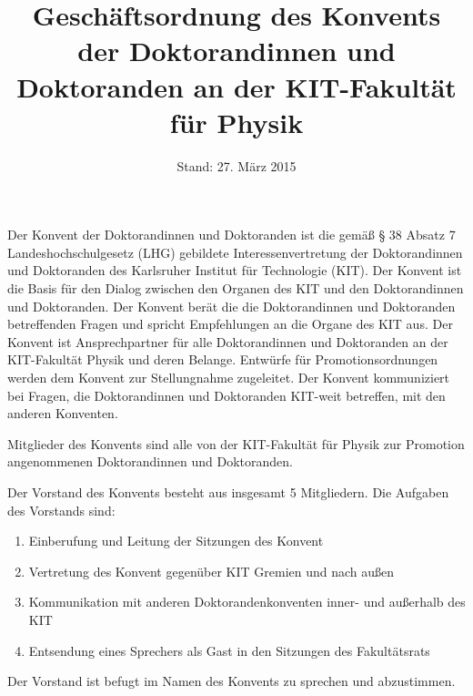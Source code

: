 \documentclass[a4paper, parskip=half, numbers=noenddot]{scrartcl}
\title{Geschäftsordnung des Konvents der Doktorandinnen und Doktoranden an der KIT-Fakultät für Physik}
\date{Stand: 27. März 2015}
\begin{document}
\maketitle



\begin{contract}


\tableofcontents


\label{aufgaben}

Der Konvent der Doktorandinnen und Doktoranden ist die gemäß § 38 Absatz 7
Landeshochschulgesetz (LHG) gebildete Interessenvertretung der Doktorandinnen und
Doktoranden des Karlsruher Institut für Technologie (KIT).
Der Konvent ist die Basis für den Dialog zwischen den Organen des KIT und den Doktorandinnen und Doktoranden.
Der Konvent berät die die Doktorandinnen und Doktoranden betreffenden Fragen und spricht Empfehlungen an die Organe des KIT aus.
Der Konvent ist Ansprechpartner für alle Doktorandinnen und Doktoranden an der KIT-Fakultät Physik und deren Belange.
Entwürfe für Promotionsordnungen werden dem Konvent zur Stellungnahme zugeleitet.
Der Konvent kommuniziert bei Fragen, die Doktorandinnen und Doktoranden KIT-weit betreffen, mit den anderen Konventen.


Mitglieder des Konvents sind alle von der KIT-Fakultät für Physik zur Promotion angenommenen Doktorandinnen und Doktoranden. 


Der Vorstand des Konvents besteht aus insgesamt 5 Mitgliedern.
Die Aufgaben des Vorstands sind:
\begin{enumerate}
	\item Einberufung und Leitung der Sitzungen des Konvent
	\item Vertretung des Konvent gegenüber KIT Gremien und nach außen
	\item Kommunikation mit anderen Doktorandenkonventen inner- und außerhalb des KIT
	\item Entsendung eines Sprechers als Gast in den Sitzungen des Fakultätsrats
\end{enumerate}
Der Vorstand ist befugt im Namen des Konvents zu sprechen und abzustimmen.


\end{contract}
\end{document}
